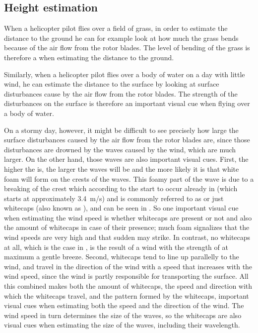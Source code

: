 \subsection{Height estimation}

When a helicopter pilot flies over a field of grass, in order to estimate the distance to the ground he can for example look at how much the grass bends because of the air flow from the rotor blades. The level of bending of the grass is therefore a  when estimating the distance to the ground.

Similarly, when a helicopter pilot flies over a body of water on a day with little wind, he can estimate the distance to the surface by looking at surface disturbances cause by the air flow from the rotor blades. The strength of the disturbances on the surface is therefore an important visual cue when flying over a body of water.


On a stormy day, however, it might be difficult to see precisely how large the surface disturbances caused by the air flow from the rotor blades are, since those disturbances are drowned by the waves caused by the wind, which are much larger. On the other hand, those waves are also important visual cues. First, the higher the  is, the larger the waves will be and the more likely it is that white foam will form on the crests of the waves. This foamy part of the wave is due to a breaking of the crest which according to the  start to occur already in  (which starts at approximately 3.4~m/s) and is commonly referred to as  or just whitecaps (also known as ), and can be seen in . So one important visual cue when estimating the wind speed is whether whitecaps are present or not and also the amount of whitecaps in case of their presence; much foam signalizes that the wind speeds are very high and that sudden \gusts may strike. In contrast, no whitecaps at all, which is the case in , is the result of a wind with the strength of at maximum a gentle breeze. Second, whitecaps tend to line up parallelly to the wind, and travel in the direction of the wind with a speed that increases with the wind speed, since the wind is partly responsible for transporting the surface. All this combined makes both the amount of whitecaps, the speed and direction with which the whitecaps travel, and the pattern formed by the whitecaps, important visual cues when estimating both the speed and the direction of the wind. The wind speed in turn determines the size of the waves, so the whitecaps are also visual cues when estimating the size of the waves, including their wavelength.

